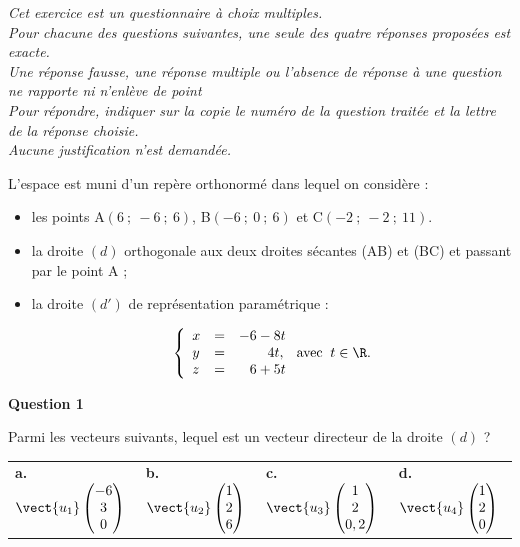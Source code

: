 \medskip

\emph{Cet exercice est un questionnaire à choix multiples.\\ Pour chacune des questions suivantes, une seule des quatre réponses proposées est exacte.\\ Une réponse fausse, une réponse multiple ou l'absence de réponse à une question ne rapporte ni n'enlève de point \\ Pour répondre, indiquer sur la copie le numéro de la question traitée et la lettre de la réponse choisie.\\ Aucune justification n'est demandée.}

\medskip

L'espace est muni d'un repère orthonormé \Oijk{} dans lequel on considère :

\begin{itemize}
\item[$\bullet$~~] les points A$(6~;~-6~;~6)$,  B$(-6~;~0~;~6)$ et C$(-2~;~-2~;~11)$.
\item[$\bullet$~~] la droite $(d)$ orthogonale aux deux droites sécantes (AB) et (BC) et passant par le point A ;
\item[$\bullet$~~] la droite $\left(d'\right)$ de représentation paramétrique :

\[\left\{\begin{array}{l c l}
x &=& -6 - 8t\\
y &=& \phantom{-6 -}4t,\\
z &=& \phantom{-}6 + 5t
\end{array}\right. \text{avec }\:t \in \R.\]
\end{itemize}

\medskip

\textbf{Question 1}

Parmi les vecteurs suivants, lequel est un vecteur directeur de la droite $(d)$ ?

\begin{center}
\begin{tabularx}{\linewidth}{*{4}{X}}
\textbf{a.~} $\vect{u_1}\begin{pmatrix}-6\\3\\0\end{pmatrix}$&
\textbf{b.~} $\vect{u_2}\begin{pmatrix}1\\2\\6\end{pmatrix}$&
\textbf{c.~} $\vect{u_3}\begin{pmatrix}1\\2\\0,2\end{pmatrix}$&
\textbf{d.~} $\vect{u_4}\begin{pmatrix}1\\2\\0\end{pmatrix}$
\end{tabularx}
\end{center}

